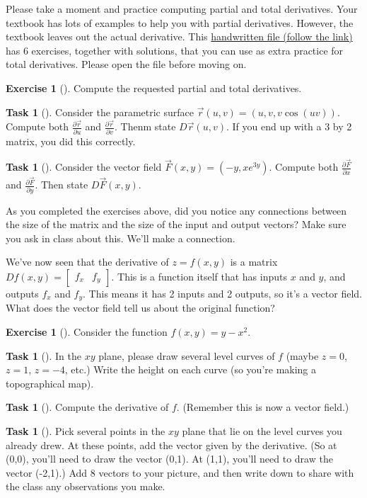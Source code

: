 \documentclass[10pt,]{book}
\theoremstyle{plain}
\theoremstyle{definition}
\theoremstyle{definition}
\theoremstyle{definition}
\theoremstyle{definition}
\newtheorem{exploration}[project]{Exercise}
\newtheorem{task}[project]{Task}
\theoremstyle{definition}
\numberwithin{equation}{section}
\newcommand{\ds}{\displaystyle}
\newcommand{\amp}{&}
\begin{document}
Please take a moment and practice computing partial and total derivatives. Your textbook has lots of examples to help you with partial derivatives. However, the textbook leaves out the actual derivative. This \href{http://db.tt/cSeKG8XO}{handwritten file (follow the link)} has 6 exercises, together with solutions, that you can use as extra practice for total derivatives. Please open the file before moving on.%
\begin{exploration}[]\label{exploration-137}
Compute the requested partial and total derivatives.%
\begin{task}[]\label{task-287}
Consider the parametric surface \(\vec r(u,v) = (u,v,v\cos(uv))\). Compute both \(\ds\frac{\partial \vec r}{\partial u}\) and \(\ds\frac{\partial \vec r}{\partial v}\). Thenm state \(D\vec r(u,v)\). If you end up with a 3 by 2 matrix, you did this correctly.%
\end{task}
\begin{task}[]\label{task-288}
Consider the vector field \(\vec F(x,y) = (-y,xe^{3y})\). Compute both \(\ds\frac{\partial \vec F}{\partial x}\) and \(\ds\frac{\partial \vec F}{\partial y}\). Then state \(D\vec F(x,y)\).%
\end{task}
\end{exploration}
As you completed the exercises above, did you notice any connections between the size of the matrix and the size of the input and output vectors? Make sure you ask in class about this. We'll make a connection.%
\par
We've now seen that the derivative of \(z=f(x,y)\) is a matrix \(Df(x,y) = \begin{bmatrix}f_x \amp  f_y
\end{bmatrix}\). This is a function itself that has inputs \(x\) and \(y\), and outputs \(f_x\) and \(f_y\). This means it has 2 inputs and 2 outputs, so it's a vector field. What does the vector field tell us about the original function?%
\begin{exploration}[]\label{exploration-138}
Consider the function \(f(x,y)=y-x^2\).%
\begin{task}[]\label{task-289}
In the \(xy\) plane, please draw several level curves of \(f\) (maybe \(z=0\), \(z=1\), \(z=-4\), etc.)  Write the height on each curve (so you're making a topographical map).%
\end{task}
\begin{task}[]\label{task-290}
Compute the derivative of \(f\). (Remember this is now a vector field.)%
\end{task}
\begin{task}[]\label{task-291}
Pick several points in the \(xy\) plane that lie on the level curves you already drew.  At these points, add the vector given by the derivative.  (So at (0,0), you'll need to draw the vector (0,1).  At (1,1), you'll need to draw the vector (-2,1).) Add 8 vectors to your picture, and then write down to share with the class any observations you make.%
\end{task}
\end{exploration}
\end{document}
